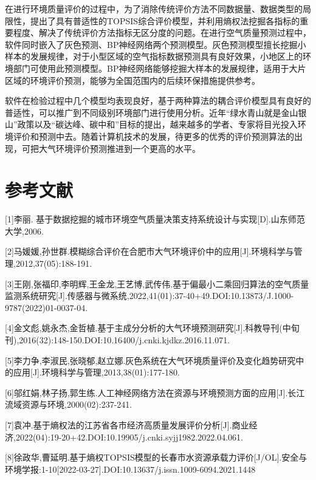 \documentclass[UTF8]{ctexart}
\begin{document}
在进行环境质量评价的过程中，为了消除传统评价方法不同数据量、数据类型的局限性，提出了具有普适性的TOPSIS综合评价模型，并利用熵权法挖掘各指标的重要程度、解决了传统评价方法指标无区分度的问题。在进行空气质量预测过程中，软件同时嵌入了灰色预测、BP神经网络两个预测模型。灰色预测模型擅长挖掘小样本的发展规律，对于小型区域的空气指标数据预测具有良好效果，小地区上的环境部门可使用此预测模型。BP神经网络能够挖掘大样本的发展规律，适用于大片区域的环境评价预测，能够为全国范围内的后续环保措施提供参考。

软件在检验过程中几个模型均表现良好，基于两种算法的耦合评价模型具有良好的普适性，可以推广到不同级别环境部门进行使用分析。近年“绿水青山就是金山银山”政策以及“碳达峰、碳中和”目标的提出，越来越多的学者、专家将目光投入环境评价和预测中去。随着计算机技术的发展，待更多的优秀的评价预测算法的出现，可把大气环境评价预测推进到一个更高的水平。

\newpage
\section{参考文献}
[1]李丽. 基于数据挖掘的城市环境空气质量决策支持系统设计与实现[D].山东师范大学,2006.

[2]马媛媛,孙世群.模糊综合评价在合肥市大气环境评价中的应用[J].环境科学与管理,2012,37(05):188-191.

[3]王刚,张福印,李明辉,王金龙,王艺博,武传伟.基于偏最小二乘回归算法的空气质量监测系统研究[J].传感器与微系统,2022,41(01):37-40+49.DOI:10.13873/J.1000-9787(2022)01-0037-04.

[4]金文彪,姚永杰,金哲植.基于主成分分析的大气环境预测研究[J].科教导刊(中旬刊),2016(32):148-150.DOI:10.16400/j.cnki.kjdkz.2016.11.071.

[5]李力争,李淑民,张晓郁,赵立娜.灰色系统在大气环境质量评价及变化趋势研究中的应用[J].环境科学与管理,2013,38(01):177-180.

[6]邬红娟,林子扬,郭生练.人工神经网络方法在资源与环境预测方面的应用[J].长江流域资源与环境,2000(02):237-241.

[7]袁冲.基于熵权法的江苏省各市经济高质量发展评价分析[J].商业经济,2022(04):19-20+42.DOI:10.19905/j.cnki.syjj1982.2022.04.061.

[8]徐政华,曹延明.基于熵权TOPSIS模型的长春市水资源承载力评价[J/OL].安全与环境学报:1-10[2022-03-27].DOI:10.13637/j.issn.1009-6094.2021.1448
\end{document}
